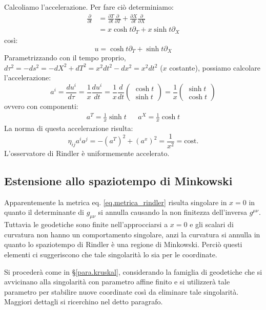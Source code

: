 Calcoliamo l'accelerazione. Per fare ciò determiniamo:
\begin{align*}
    \frac{\partial}{\partial t} &= \frac{\partial T}{\partial t}\frac{\partial}{\partial T} + \frac{\partial X}{\partial t}\frac{\partial}{\partial X}\\
    &= x\cosh t \partial_T + x\sinh t \partial_X
\end{align*}
così:
\begin{equation*}
    u = \cosh t \partial_T + \sinh t \partial_X
\end{equation*}
Parametrizzando con il tempo proprio, $d\tau^2 = -ds^2 = -dX^2 +dT^2 = x^2dt^2-dx^2 = x^2dt^2$ ($x$ costante), possiamo calcolare l'accelerazione:
\begin{equation*}
    a^i = \frac{d u^i}{d\tau} = \frac{1}{x}\frac{du^i}{dt} = \frac{1}{x}\frac{d}{dt} \begin{pmatrix} \cosh t \\ \sinh t \end{pmatrix} = \frac{1}{x} \begin{pmatrix} \sinh t \\ \cosh t \end{pmatrix}
\end{equation*}
ovvero con componenti:
\begin{align*}
    a^T = \frac{1}{x}\sinh t && a^X= \frac{1}{x}\cosh t
\end{align*}
La norma di questa accelerazione risulta:
\begin{equation*}
    \eta_{ij}a^i a^j = -(a^T)^2 + (a^x)^2 = \frac{1}{x^2} = \textrm{cost.}
\end{equation*}
L'osservatore di Rindler è uniformemente accelerato.
\subsection{Estensione allo spaziotempo di Minkowski}
Apparentemente la metrica eq. \ref{eq.metrica_rindler} risulta singolare in $x=0$ in quanto il determinante di $g_{\mu\nu}$ si annulla causando la non finitezza dell'inversa $g^{\mu\nu}$. Tuttavia le geodetiche sono finite nell'approcciarsi a $x=0$ e gli scalari di curvatura non hanno un comportamento singolare, anzi la curvatura si annulla in quanto lo spaziotempo di Rindler è una regione di Minkowski. Perciò questi elementi ci suggeriscono che tale singolarità lo sia per le coordinate.

Si procederà come in \S\ref{para.kruskal}, considerando la famiglia di geodetiche che si avvicinano alla singolarità con parametro affine finito e si utilizzerà tale parametro per stabilire nuove coordinate così da eliminare tale singolarità. Maggiori dettagli si ricerchino nel detto paragrafo.

